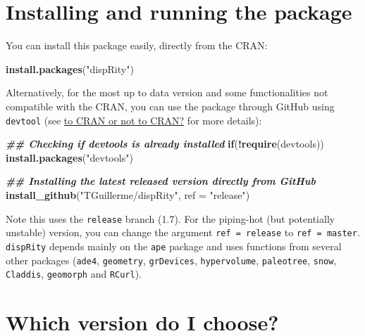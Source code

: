 \documentclass[
]{book}
\newenvironment{Shaded}{\begin{snugshade}}{\end{snugshade}}
\newcommand{\AttributeTok}[1]{\textcolor[rgb]{0.13,0.29,0.53}{#1}}
\newcommand{\ControlFlowTok}[1]{\textcolor[rgb]{0.13,0.29,0.53}{\textbf{#1}}}
\newcommand{\DocumentationTok}[1]{\textcolor[rgb]{0.56,0.35,0.01}{\textbf{\textit{#1}}}}
\newcommand{\FunctionTok}[1]{\textcolor[rgb]{0.13,0.29,0.53}{\textbf{#1}}}
\newcommand{\NormalTok}[1]{#1}
\newcommand{\SpecialCharTok}[1]{\textcolor[rgb]{0.81,0.36,0.00}{\textbf{#1}}}
\newcommand{\StringTok}[1]{\textcolor[rgb]{0.31,0.60,0.02}{#1}}
\begin{document}
\hypertarget{installing-and-running-the-package}{%
\section{Installing and running the package}\label{installing-and-running-the-package}}

You can install this package easily, directly from the CRAN:

\begin{Shaded}
\begin{Highlighting}[]
\FunctionTok{install.packages}\NormalTok{(}\StringTok{"dispRity"}\NormalTok{)}
\end{Highlighting}
\end{Shaded}

Alternatively, for the most up to data version and some functionalities not compatible with the CRAN, you can use the package through GitHub using \texttt{devtool} (see \protect\hyperlink{noCRAN}{to CRAN or not to CRAN?} for more details):

\begin{Shaded}
\begin{Highlighting}[]
\DocumentationTok{\#\# Checking if devtools is already installed}
\ControlFlowTok{if}\NormalTok{(}\SpecialCharTok{!}\FunctionTok{require}\NormalTok{(devtools)) }\FunctionTok{install.packages}\NormalTok{(}\StringTok{"devtools"}\NormalTok{)}

\DocumentationTok{\#\# Installing the latest released version directly from GitHub}
\FunctionTok{install\_github}\NormalTok{(}\StringTok{"TGuillerme/dispRity"}\NormalTok{, }\AttributeTok{ref =} \StringTok{"release"}\NormalTok{)}
\end{Highlighting}
\end{Shaded}

Note this uses the \texttt{release} branch (1.7).
For the piping-hot (but potentially unstable) version, you can change the argument \texttt{ref\ =\ release} to \texttt{ref\ =\ master}.
\texttt{dispRity} depends mainly on the \texttt{ape} package and uses functions from several other packages (\texttt{ade4}, \texttt{geometry}, \texttt{grDevices}, \texttt{hypervolume}, \texttt{paleotree}, \texttt{snow}, \texttt{Claddis}, \texttt{geomorph} and \texttt{RCurl}).

\hypertarget{version}{%
\section{Which version do I choose?}\label{version}}
\end{document}

